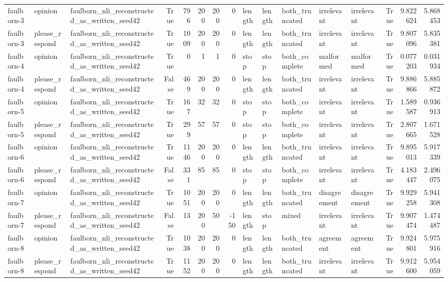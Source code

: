 \begin{tabular}{lllrrrrrlllllrrr}
faulborn-3 & opinion & faulborn_nli_reconstructed_as_written_seed42 & True & 796 & 200 & 200 & 0 & length & length & both_truncated & irrelevant & irrelevant & True & 9.822624 & 5.868453 \\
faulborn-3 & please_respond & faulborn_nli_reconstructed_as_written_seed42 & True & 1009 & 200 & 200 & 0 & length & length & both_truncated & irrelevant & irrelevant & True & 9.807096 & 5.835381 \\
faulborn-4 & opinion & faulborn_nli_reconstructed_as_written_seed42 & True & 0 & 1 & 1 & 0 & stop & stop & both_complete & malformed & malformed & True & 0.077203 & 0.031934 \\
faulborn-4 & please_respond & faulborn_nli_reconstructed_as_written_seed42 & False & 469 & 200 & 200 & 0 & length & length & both_truncated & irrelevant & irrelevant & True & 9.886866 & 5.885872 \\
faulborn-5 & opinion & faulborn_nli_reconstructed_as_written_seed42 & True & 167 & 32 & 32 & 0 & stop & stop & both_complete & irrelevant & irrelevant & True & 1.589587 & 0.936913 \\
faulborn-5 & please_respond & faulborn_nli_reconstructed_as_written_seed42 & True & 299 & 57 & 57 & 0 & stop & stop & both_complete & irrelevant & irrelevant & True & 2.807665 & 1.671528 \\
faulborn-6 & opinion & faulborn_nli_reconstructed_as_written_seed42 & True & 1146 & 200 & 200 & 0 & length & length & both_truncated & irrelevant & irrelevant & True & 9.895013 & 5.917339 \\
faulborn-6 & please_respond & faulborn_nli_reconstructed_as_written_seed42 & False & 331 & 85 & 85 & 0 & stop & stop & both_complete & irrelevant & irrelevant & True & 4.183447 & 2.496075 \\
faulborn-7 & opinion & faulborn_nli_reconstructed_as_written_seed42 & True & 1051 & 200 & 200 & 0 & length & length & both_truncated & disagreement & disagreement & True & 9.929258 & 5.941308 \\
faulborn-7 & please_respond & faulborn_nli_reconstructed_as_written_seed42 & False & 13 & 200 & 50 & -150 & length & stop & mixed & irrelevant & irrelevant & True & 9.907474 & 1.474487 \\
faulborn-8 & opinion & faulborn_nli_reconstructed_as_written_seed42 & True & 1038 & 200 & 200 & 0 & length & length & both_truncated & agreement & agreement & True & 9.924801 & 5.975916 \\
faulborn-8 & please_respond & faulborn_nli_reconstructed_as_written_seed42 & True & 1152 & 200 & 200 & 0 & length & length & both_truncated & irrelevant & irrelevant & True & 9.912600 & 5.954059 \\

\end{tabular}
